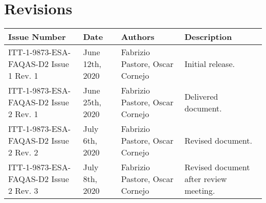 
\section*{Revisions}
\label{sec:revisions}


\setlength\LTleft{0pt}
\setlength\LTright{0pt}
\tiny 
\begin{longtable}{|p{2cm}|p{1cm}|p{1.5cm}|p{9cm}|@{}}
\label{table:codeoperators} \\
\hline
\textbf{Issue Number}&\textbf{Date}&\textbf{Authors}&\textbf{Description}\\
\hline
ITT-1-9873-ESA-FAQAS-D2
Issue 1 Rev. 1&
June 12th, 2020&
Fabrizio Pastore, Oscar Cornejo&
\begin{minipage}{8cm}
Initial release.
\end{minipage}
\\
\hline
ITT-1-9873-ESA-FAQAS-D2
Issue 2 Rev. 1&
June 25th, 2020&
Fabrizio Pastore, Oscar Cornejo&
\begin{minipage}{8cm}
Delivered document.
\end{minipage}
\\
\hline
ITT-1-9873-ESA-FAQAS-D2
Issue 2 Rev. 2&
July 6th, 2020&
Fabrizio Pastore, Oscar Cornejo&
\begin{minipage}{8cm}
Revised document.
\end{minipage}
\\
\hline
ITT-1-9873-ESA-FAQAS-D2
Issue 2 Rev. 3&
July 8th, 2020&
Fabrizio Pastore, Oscar Cornejo&
\begin{minipage}{8cm}
Revised document after review meeting.
\end{minipage}
\\
\hline



                                                    
\end{longtable}
\normalsize

\clearpage